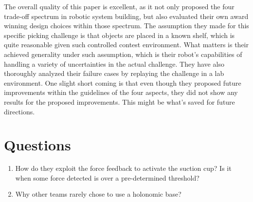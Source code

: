 \documentclass[10pt, twocolumn]{article}
\begin{document}
The overall quality of this paper is excellent, as it not only proposed the four
trade-off spectrum in robotic system building, but also evaluated their own
award winning design choices within those spectrum. The assumption they made
for this specific picking challenge is that objects are placed in a known shelf,
which is quite reasonable given such controlled contest environment. What matters
is their achieved generality under such assumption, which is their robot's
capabilities of handling a variety of uncertainties in the actual challenge.
They have also thoroughly analyzed their failure cases by replaying the challenge
in a lab environment. One slight short coming is that even though they proposed
future improvements within the guidelines of the four aspects, they did not
show any results for the proposed improvements. This might be what's saved for
future directions.

\section{Questions}
\begin{enumerate}
  \item How do they exploit the force feedback to activate the suction cup? Is
    it when some force detected is over a pre-determined threshold?

  \item Why other teams rarely chose to use a holonomic base?
\end{enumerate}
\end{document}
